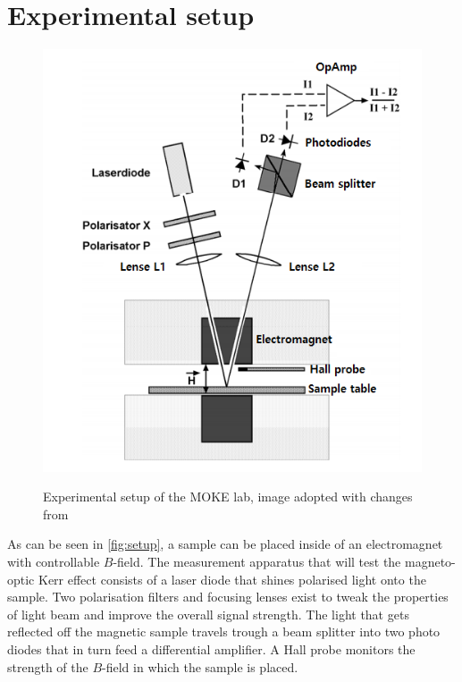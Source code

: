 
\section{Experimental setup}
\label{sec:setup}

\begin{figure}
	\includegraphics[width=1.0\textwidth]{./fig/setup.png}
	\caption{}{Experimental setup of the MOKE lab, image adopted with changes from \cite{lab-manual}}
	\label{fig:setup}
\end{figure}

As can be seen in \autoref{fig:setup}, a sample can be placed inside of an
electromagnet with controllable $B$-field. The measurement apparatus that will test
the magneto-optic Kerr effect consists of a laser diode that shines polarised light
onto the sample. Two polarisation filters and focusing lenses exist to tweak the
properties of light beam and improve the overall signal strength. The light that gets
reflected off the magnetic sample travels trough a beam splitter into two photo
diodes that in turn feed a differential amplifier. A Hall probe monitors the strength
of the $B$-field in which the sample is placed.
